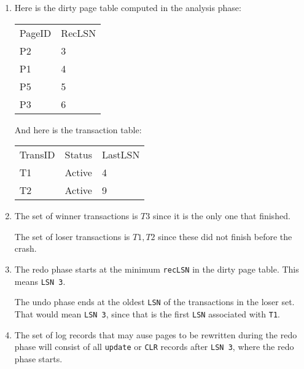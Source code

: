 \documentclass[11pt]{article}
\begin{document}
\begin{enumerate}
  \item
    Here is the dirty page table computed in the analysis phase:

    \begin{center}
      \begin{tabular}{ll}
      \rowcolor[HTML]{C0C0C0} 
      PageID & RecLSN \\
      P2     & 3      \\
      P1     & 4      \\
      P5     & 5      \\
      P3     & 6     
      \end{tabular}
    \end{center}

    And here is the transaction table:

    \begin{center}
      \centering
      \begin{tabular}{lll}
      \rowcolor[HTML]{C0C0C0} 
      TransID                    & Status & LastLSN \\
      \cellcolor[HTML]{6434FC}T1 & Active & 4       \\
      \cellcolor[HTML]{67FD9A}T2 & Active & 9      
      \end{tabular}
    \end{center}
  \item
    The set of winner transactions is ${T3}$ since it is the only one that finished.

    The set of loser transactions is ${T1,T2}$ since these did not finish before the crash.
  \item
    The redo phase starts at the minimum \verb|recLSN| in the dirty page table. This means 
    \verb|LSN 3|.

    The undo phase ends at the oldest \verb|LSN| of the transactions in the
    loser set. That would mean \verb|LSN 3|, since that is the first \verb|LSN|
    associated with \verb|T1|.
  \item
    The set of log records that may ause pages to be rewritten during the redo phase will
    consist of all \verb|update| or \verb|CLR| records after \verb|LSN 3|, where the redo phase starts.


\end{enumerate}
\end{document}
